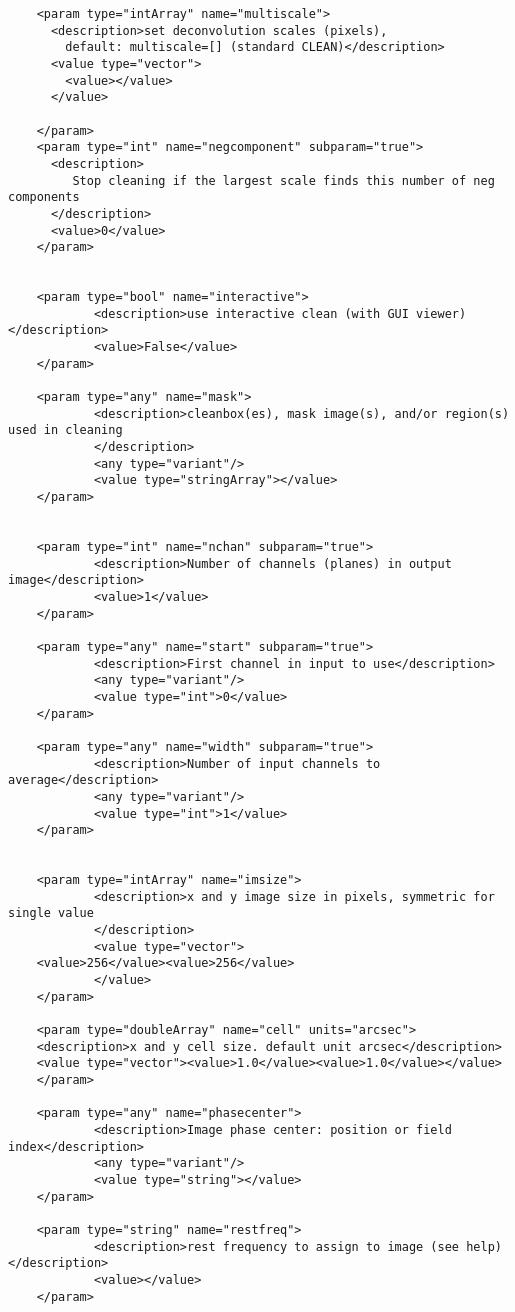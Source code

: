 \begin{verbatim}
    <param type="intArray" name="multiscale">
      <description>set deconvolution scales (pixels), 
        default: multiscale=[] (standard CLEAN)</description>
      <value type="vector">
        <value></value>
      </value>

    </param>
    <param type="int" name="negcomponent" subparam="true">
      <description>
         Stop cleaning if the largest scale finds this number of neg components
      </description>
      <value>0</value>
    </param>


    <param type="bool" name="interactive">
            <description>use interactive clean (with GUI viewer)</description>
            <value>False</value>
    </param>

    <param type="any" name="mask">
            <description>cleanbox(es), mask image(s), and/or region(s)  used in cleaning
            </description>
            <any type="variant"/>
            <value type="stringArray"></value>
    </param>


    <param type="int" name="nchan" subparam="true">
            <description>Number of channels (planes) in output image</description>
            <value>1</value>
    </param>

    <param type="any" name="start" subparam="true">
            <description>First channel in input to use</description>
            <any type="variant"/>
            <value type="int">0</value>
    </param>

    <param type="any" name="width" subparam="true">
            <description>Number of input channels to average</description>
            <any type="variant"/>
            <value type="int">1</value>
    </param>


    <param type="intArray" name="imsize">
            <description>x and y image size in pixels, symmetric for single value
            </description>
            <value type="vector">
    <value>256</value><value>256</value>
            </value>
    </param>

    <param type="doubleArray" name="cell" units="arcsec">
    <description>x and y cell size. default unit arcsec</description>
    <value type="vector"><value>1.0</value><value>1.0</value></value>
    </param>

    <param type="any" name="phasecenter">
            <description>Image phase center: position or field index</description>
            <any type="variant"/>
            <value type="string"></value>
    </param>

    <param type="string" name="restfreq">
            <description>rest frequency to assign to image (see help)</description>
            <value></value>
    </param>


\end{verbatim}
